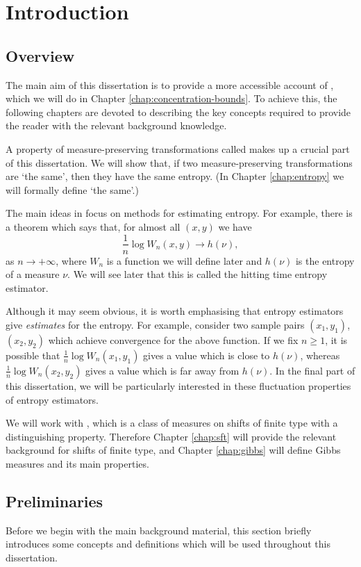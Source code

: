 \chapter{Introduction}
\section{Overview}
The main aim of this dissertation is to provide a more accessible account of \cite{chazottes-maldonado:cbfee}, which we will do in Chapter \ref{chap:concentration-bounds}. To achieve this, the following chapters are devoted to describing the key concepts required to provide the reader with the relevant background knowledge.

A property of measure-preserving transformations called  makes up a crucial part of this dissertation. We will show that, if two measure-preserving transformations are `the same', then they have the same entropy. (In Chapter \ref{chap:entropy} we will formally define `the same'.)

The main ideas in \cite{chazottes-maldonado:cbfee} focus on methods for estimating entropy. For example, there is a theorem which says that, for almost all $(x, y)$ we have
\[
	\frac{1}{n} \log{W_n(x, y)} \to h(\nu),
\]
as $n \to +\infty$, where $W_n$ is a function we will define later and $h(\nu)$ is the entropy of a measure $\nu$. We will see later that this is called the hitting time entropy estimator.

Although it may seem obvious, it is worth emphasising that entropy estimators give \emph{estimates} for the entropy. For example, consider two sample pairs $(x_1, y_1)$, $(x_2, y_2)$ which achieve convergence for the above function. If we fix $n \geq 1$, it is possible that $\frac{1}{n} \log{W_n(x_1, y_1)}$ gives a value which is close to $h(\nu)$, whereas $\frac{1}{n} \log{W_n(x_2, y_2)}$ gives a value which is far away from $h(\nu)$. In the final part of this dissertation, we will be particularly interested in these fluctuation properties of entropy estimators.

We will work with , which is a class of measures on shifts of finite type with a distinguishing property. Therefore Chapter \ref{chap:sft} will provide the relevant background for shifts of finite type, and Chapter \ref{chap:gibbs} will define Gibbs measures and its main properties.

\section{Preliminaries}
Before we begin with the main background material, this section briefly introduces some concepts and definitions which will be used throughout this dissertation.


